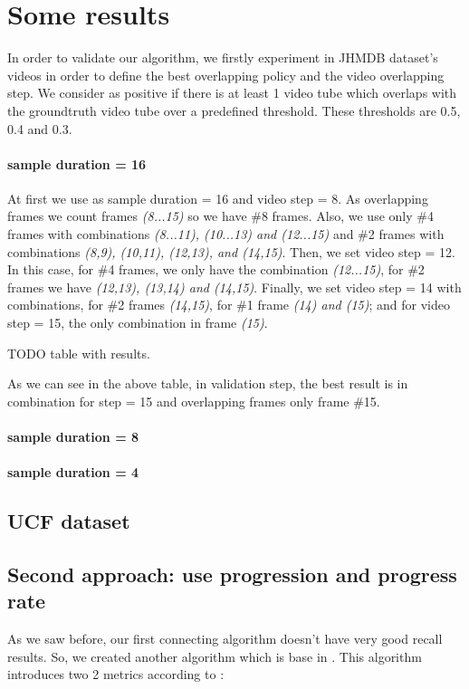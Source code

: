 \documentclass{report}
\begin{document}
\section{Some results}

In order to validate our algorithm, we firstly experiment in JHMDB dataset's videos in order to define the best overlapping policy and
the video overlapping step. We consider as positive if there is at least 1 video tube which overlaps with the groundtruth video tube
over a predefined threshold.  These thresholds are 0.5, 0.4 and 0.3. 

\paragraph{sample duration = 16} At first we use as sample duration = 16 and video step = 8. As overlapping frames we count frames
\textit{(8...15)} so we have \#8 frames. Also, we use only \#4 frames with combinations \textit{(8...11), (10...13) and (12...15)} and 
\#2 frames with combinations \textit{(8,9), (10,11), (12,13), and (14,15)}. Then, we set video step = 12. In this case, for \#4 frames, we
only have the combination \textit{(12...15)}, for \#2 frames we have \textit{(12,13), (13,14) and (14,15)}. Finally, we set video step = 14
with combinations, for \#2 frames \textit{(14,15)}, for \#1 frame \textit{(14) and (15)}; and for video step = 15, the only combination in
frame \textit{(15)}.

TODO table with results.

As we can see in the above table, in validation step, the best result is in combination for step = 15 and overlapping frames only frame \#15.

\paragraph{sample duration = 8}

\paragraph{sample duration = 4}


 
\subsection{UCF dataset}


\subsection{Second approach: use progression and progress rate}
As we saw before, our first connecting algorithm doesn't have very good recall results. So, we created another algorithm which is base in \cite{}. This
algorithm introduces two 2 metrics according to \cite{}:
\end{document}
